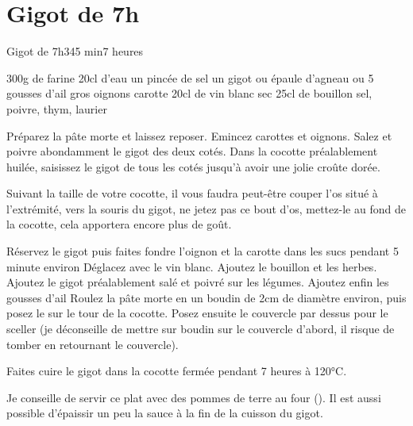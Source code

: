 {\section{Gigot de 7h}
\begin{recette}{Gigot de 7h}{3}{45 min}{7 heures}
\begin{ingredients}
\ingredient 300g de farine
\ingredient 20cl d'eau
\ingredient un pincée de sel
\ingredient[Gigot]
\ingredient un gigot ou épaule d'agneau
 ou 5 gousses d'ail
 gros oignons
 carotte
\ingredient 20cl de vin blanc sec
\ingredient 25cl de bouillon
\ingredient sel, poivre, thym, laurier
\end{ingredients}


\begin{preparation}
\etape Préparez la pâte morte et laissez reposer.
\etape Emincez carottes et oignons.
\etape Salez et poivre abondamment le gigot des deux cotés.
\etape Dans la cocotte préalablement huilée, saisissez le gigot de tous les cotés jusqu'à avoir une jolie croûte dorée.
\begin{remarque}
Suivant la taille de votre cocotte, il vous faudra peut-être couper l'os situé à l'extrémité, vers la souris du gigot, ne jetez 
pas ce bout d'os, mettez-le au fond de la cocotte, cela apportera encore plus de goût.
\end{remarque}
\etape Réservez le gigot puis faites fondre l'oignon et la carotte dans les sucs pendant 5 minute environ
\etape Déglacez avec le vin blanc. Ajoutez le bouillon et les herbes. 
\etape Ajoutez le gigot préalablement salé et poivré sur les légumes. Ajoutez enfin les gousses d'ail
\etape Roulez la pâte morte en un boudin de 2cm de diamètre environ, puis posez le sur le tour de la cocotte. Posez ensuite le couvercle par dessus pour le sceller (je déconseille de mettre sur boudin sur le couvercle d'abord, il risque de tomber en retournant le couvercle).
\end{preparation}

\begin{cuisson}
Faites cuire le gigot dans la cocotte fermée pendant 7 heures à 120°C. 

Je conseille de servir ce plat avec des pommes de terre au four (). Il est aussi possible 
d'épaissir un peu la sauce à la fin de la cuisson du gigot. 
\end{cuisson}
\end{recette}

}
